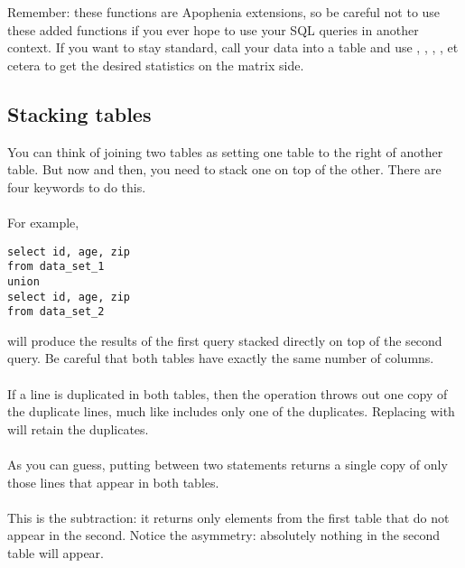 Remember: these functions are Apophenia extensions, so be careful not to
use these added functions if you ever hope to use your SQL queries in
another context. If you want to stay standard, call your data into
a table and use , ,
, , et cetera to get the desired
statistics on the matrix side.

\subsection{Stacking tables}
You can think of joining two tables as setting one table to the right of
another table. But now and then, you need to stack one on top of
the other. There are four keywords to do this.

\paragraph{} For example, 
\begin{lstlisting}
select id, age, zip
from data_set_1
union
select id, age, zip
from data_set_2
\end{lstlisting}
will produce the results of the first query stacked directly on top
of the second query. Be careful that both tables have exactly the same
number of columns.

\paragraph{} If a line is duplicated in both tables,
then the  operation throws out
one copy of the duplicate lines, much like 
includes only one of the duplicates. Replacing  with  will retain the duplicates.

\paragraph{} As you can guess,
putting  between two  statements
returns a single copy of only those lines that appear in both tables.

\paragraph{} This is the subtraction: it returns only
elements from the first table that do not appear in the second. Notice
the asymmetry: absolutely nothing in the second table will appear. 

